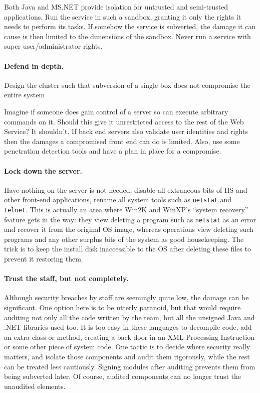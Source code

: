 \documentclass[draft]{report}
\begin{document}
Both Java and MS.NET provide isolation for untrusted and semi-trusted
applications. Run the service in such a sandbox, granting it only the
rights it needs to perform its tasks. If somehow the service is
subverted, the damage it can cause is then limited to the dimensions of
the sandbox. Never run a service with super user/administrator rights.

\paragraph{Defend in depth.}

Design the cluster such that subversion of a single box does not
compromise the entire system

Imagine if someone does gain control of a server so can execute
arbitrary commands on it. Should this give it unrestricted access to the
rest of the Web Service? It shouldn't. If back end servers also validate
user identities and rights then the damages a compromised front end can
do is limited. Also, use some penetration detection tools and have a
plan in place for a compromise.

\paragraph{Lock down the server.}

Have nothing on the server is not needed, disable all extraneous bits of
IIS and other front-end applications, rename all system tools such as
\verb$netstat$ and \verb$telnet$. This is actually an area where Win2K
and WinXP's ``system recovery'' feature gets in the way: they view
deleting a program such as \verb$netstat$ as an error and recover it
from the original OS image, whereas operations view deleting such
programs and any other surplus bits of the system as good housekeeping.
The trick is to keep the install disk inaccessible to the OS after
deleting these files to prevent it restoring them.

\paragraph{Trust the staff, but not completely.}

Although security breaches by staff are seemingly quite low, the damage
can be significant. One option here is to be utterly paranoid, but that
would require auditing not only all the code written by the team, but
all the unsigned Java and .NET libraries used too. It is too easy in
these languages to decompile code, add an extra class or method,
creating a back door in an XML Processing Instruction or some other
piece of system code. One tactic is to decide where security really
matters, and isolate those components and audit them rigorously, while
the rest can be treated less cautiously. Signing modules after auditing
prevents them from being subverted later. Of course, audited components
can no longer trust the unaudited elements.
\end{document}

